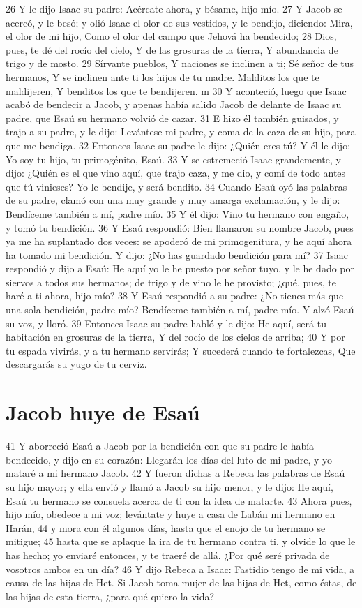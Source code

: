 26 Y le dijo Isaac su padre: Acércate ahora, y bésame, hijo mío.
27 Y Jacob se acercó, y le besó; y olió Isaac el olor de sus vestidos, y le bendijo, diciendo:
Mira, el olor de mi hijo,
Como el olor del campo que Jehová ha bendecido;
28 Dios, pues, te dé del rocío del cielo,
Y de las grosuras de la tierra,
Y abundancia de trigo y de mosto.
29 Sírvante pueblos,
Y naciones se inclinen a ti;
Sé señor de tus hermanos,
Y se inclinen ante ti los hijos de tu madre.
Malditos los que te maldijeren,
Y benditos los que te bendijeren. m
30 Y aconteció, luego que Isaac acabó de bendecir a Jacob, y apenas había salido Jacob de delante de Isaac su padre, que Esaú su hermano volvió de cazar.
31 E hizo él también guisados, y trajo a su padre, y le dijo: Levántese mi padre, y coma de la caza de su hijo, para que me bendiga.
32 Entonces Isaac su padre le dijo: ¿Quién eres tú? Y él le dijo: Yo soy tu hijo, tu primogénito, Esaú.
33 Y se estremeció Isaac grandemente, y dijo: ¿Quién es el que vino aquí, que trajo caza, y me dio, y comí de todo antes que tú vinieses? Yo le bendije, y será bendito.
34 Cuando Esaú oyó las palabras de su padre, clamó con una muy grande y muy amarga exclamación, y le dijo: Bendíceme también a mí, padre mío.
35 Y él dijo: Vino tu hermano con engaño, y tomó tu bendición.
36 Y Esaú respondió: Bien llamaron su nombre Jacob, pues ya me ha suplantado dos veces: se apoderó de mi primogenitura, y he aquí ahora ha tomado mi bendición. Y dijo: ¿No has guardado bendición para mí?
37 Isaac respondió y dijo a Esaú: He aquí yo le he puesto por señor tuyo, y le he dado por siervos a todos sus hermanos; de trigo y de vino le he provisto; ¿qué, pues, te haré a ti ahora, hijo mío?
38 Y Esaú respondió a su padre: ¿No tienes más que una sola bendición, padre mío? Bendíceme también a mí, padre mío. Y alzó Esaú su voz, y lloró.
39 Entonces Isaac su padre habló y le dijo:
He aquí, será tu habitación en grosuras de la tierra,
Y del rocío de los cielos de arriba;
40 Y por tu espada vivirás, y a tu hermano servirás;
Y sucederá cuando te fortalezcas,
Que descargarás su yugo de tu cerviz.

\section*{Jacob huye de Esaú}

41 Y aborreció Esaú a Jacob por la bendición con que su padre le había bendecido, y dijo en su corazón: Llegarán los días del luto de mi padre, y yo mataré a mi hermano Jacob.
42 Y fueron dichas a Rebeca las palabras de Esaú su hijo mayor; y ella envió y llamó a Jacob su hijo menor, y le dijo: He aquí, Esaú tu hermano se consuela acerca de ti con la idea de matarte.
43 Ahora pues, hijo mío, obedece a mi voz; levántate y huye a casa de Labán mi hermano en Harán,
44 y mora con él algunos días, hasta que el enojo de tu hermano se mitigue;
45 hasta que se aplaque la ira de tu hermano contra ti, y olvide lo que le has hecho; yo enviaré entonces, y te traeré de allá. ¿Por qué seré privada de vosotros ambos en un día?
46 Y dijo Rebeca a Isaac: Fastidio tengo de mi vida, a causa de las hijas de Het. Si Jacob toma mujer de las hijas de Het, como éstas, de las hijas de esta tierra, ¿para qué quiero la vida?

